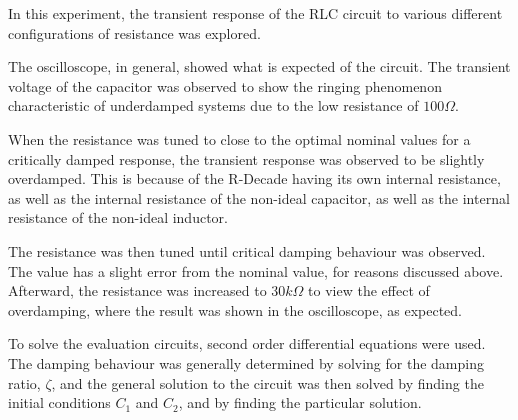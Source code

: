 In this experiment, the transient response of the RLC circuit to various different configurations of resistance was explored.

The oscilloscope, in general, showed what is expected of the circuit. The transient voltage of the capacitor was observed to show the ringing phenomenon characteristic of underdamped systems due to the low resistance of $100\Omega$.

When the resistance was tuned to close to the optimal nominal values for a critically damped response, the transient response was observed to be slightly overdamped. This is because of the R-Decade having its own internal resistance, as well as the internal resistance of the non-ideal capacitor, as well as the internal resistance of the non-ideal inductor.

The resistance was then tuned until critical damping behaviour was observed. The value has a slight error from the nominal value, for reasons discussed above. Afterward, the resistance was increased to $30k\Omega$ to view the effect of overdamping, where the result was shown in the oscilloscope, as expected.

To solve the evaluation circuits, second order differential equations were used. The damping behaviour was generally determined by solving for the damping ratio, $\zeta$, and the general solution to the circuit was then solved by finding the initial conditions $C_1$ and $C_2$, and by finding the particular solution.